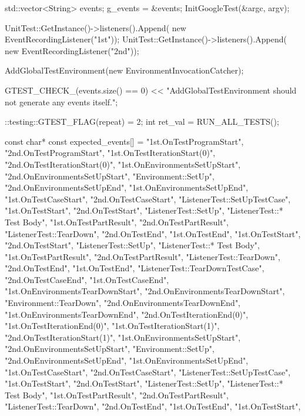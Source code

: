 \begin{DoxyCode}
                                {
  std::vector<String> events;
  g_events = &events;
  InitGoogleTest(&argc, argv);

  UnitTest::GetInstance()->listeners().Append(
      new EventRecordingListener("1st"));
  UnitTest::GetInstance()->listeners().Append(
      new EventRecordingListener("2nd"));

  AddGlobalTestEnvironment(new EnvironmentInvocationCatcher);

  GTEST_CHECK_(events.size() == 0)
      << "AddGlobalTestEnvironment should not generate any events itself.";

  ::testing::GTEST_FLAG(repeat) = 2;
  int ret_val = RUN_ALL_TESTS();

  const char* const expected_events[] = {
    "1st.OnTestProgramStart",
    "2nd.OnTestProgramStart",
    "1st.OnTestIterationStart(0)",
    "2nd.OnTestIterationStart(0)",
    "1st.OnEnvironmentsSetUpStart",
    "2nd.OnEnvironmentsSetUpStart",
    "Environment::SetUp",
    "2nd.OnEnvironmentsSetUpEnd",
    "1st.OnEnvironmentsSetUpEnd",
    "1st.OnTestCaseStart",
    "2nd.OnTestCaseStart",
    "ListenerTest::SetUpTestCase",
    "1st.OnTestStart",
    "2nd.OnTestStart",
    "ListenerTest::SetUp",
    "ListenerTest::* Test Body",
    "1st.OnTestPartResult",
    "2nd.OnTestPartResult",
    "ListenerTest::TearDown",
    "2nd.OnTestEnd",
    "1st.OnTestEnd",
    "1st.OnTestStart",
    "2nd.OnTestStart",
    "ListenerTest::SetUp",
    "ListenerTest::* Test Body",
    "1st.OnTestPartResult",
    "2nd.OnTestPartResult",
    "ListenerTest::TearDown",
    "2nd.OnTestEnd",
    "1st.OnTestEnd",
    "ListenerTest::TearDownTestCase",
    "2nd.OnTestCaseEnd",
    "1st.OnTestCaseEnd",
    "1st.OnEnvironmentsTearDownStart",
    "2nd.OnEnvironmentsTearDownStart",
    "Environment::TearDown",
    "2nd.OnEnvironmentsTearDownEnd",
    "1st.OnEnvironmentsTearDownEnd",
    "2nd.OnTestIterationEnd(0)",
    "1st.OnTestIterationEnd(0)",
    "1st.OnTestIterationStart(1)",
    "2nd.OnTestIterationStart(1)",
    "1st.OnEnvironmentsSetUpStart",
    "2nd.OnEnvironmentsSetUpStart",
    "Environment::SetUp",
    "2nd.OnEnvironmentsSetUpEnd",
    "1st.OnEnvironmentsSetUpEnd",
    "1st.OnTestCaseStart",
    "2nd.OnTestCaseStart",
    "ListenerTest::SetUpTestCase",
    "1st.OnTestStart",
    "2nd.OnTestStart",
    "ListenerTest::SetUp",
    "ListenerTest::* Test Body",
    "1st.OnTestPartResult",
    "2nd.OnTestPartResult",
    "ListenerTest::TearDown",
    "2nd.OnTestEnd",
    "1st.OnTestEnd",
    "1st.OnTestStart",
}}
\end{DoxyCode}
